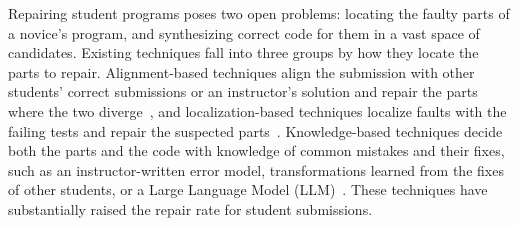 \documentclass[10pt,conference]{IEEEtran}
\begin{document}
Repairing student programs poses two open problems: locating the faulty parts of a novice's program, and synthesizing correct code for them in a vast space of candidates. Existing techniques fall into three groups by how they locate the parts to repair. Alignment-based techniques align the submission with other students' correct submissions or an instructor's solution and repair the parts where the two diverge~\cite{gulwani2018automated, wang2018search, hu2019re, ahmed2022verifix, choi2021automated, choi2025automated}, and localization-based techniques localize faults with the failing tests and repair the suspected parts~\cite{xie2024brafar, orvalho2025counterexample, dai2025less}. Knowledge-based techniques decide both the parts and the code with knowledge of common mistakes and their fixes, such as an instructor-written error model, transformations learned from the fixes of other students, or a Large Language Model (LLM)~\cite{singh2013automated, rolim2017learning, heo2023referent, zhang2024pydex, zhao2026peer, dai2026learner}. These techniques have substantially raised the repair rate for student submissions.
\end{document}
